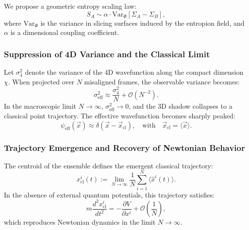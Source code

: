 \documentclass[12pt]{article}
\begin{document}
We propose a geometric entropy scaling law:
\begin{equation}
\label{eq:entropy_scaling}
S_A \sim \alpha \cdot \text{Var}_\Phi[\Sigma_A - \Sigma_B],
\end{equation}
where $\text{Var}_\Phi$ is the variance in slicing surfaces induced by the entropion field, and $\alpha$ is a dimensional coupling coefficient.

\subsubsection*{Suppression of 4D Variance and the Classical Limit}

Let $\sigma_4^2$ denote the variance of the 4D wavefunction along the compact dimension $\chi$. When projected over $N$ misaligned frames, the observable variance becomes:
\begin{equation}
\label{eq:variance_reduction}
\sigma_{\text{eff}}^2 \approx \frac{\sigma_4^2}{N} + \mathcal{O}(N^{-2}).
\end{equation}
In the macroscopic limit $N \to \infty$, $\sigma_{\text{eff}}^2 \to 0$, and the 3D shadow collapses to a classical point trajectory. The effective wavefunction becomes sharply peaked:
\begin{equation}
\label{eq:classical_wavepacket}
\psi_{\text{eff}}(\vec{x}) \approx \delta(\vec{x} - \vec{x}_{\text{cl}}), \quad \text{with} \quad \vec{x}_{\text{cl}} = \langle \vec{x} \rangle.
\end{equation}

\subsubsection*{Trajectory Emergence and Recovery of Newtonian Behavior}

The centroid of the ensemble defines the emergent classical trajectory:
\begin{equation}
\label{eq:trajectory_definition}
x^i_{\text{cl}}(t) := \lim_{N \to \infty} \frac{1}{N} \sum_{i=1}^N \langle \hat{x}^i(t) \rangle.
\end{equation}
In the absence of external quantum potentials, this trajectory satisfies:
\begin{equation}
\label{eq:newton_recovery}
m \frac{d^2 x^i_{\text{cl}}}{dt^2} = -\frac{\partial V}{\partial x^i} + \mathcal{O}\left(\frac{1}{N}\right),
\end{equation}
which reproduces Newtonian dynamics in the limit $N \to \infty$.
\end{document}
